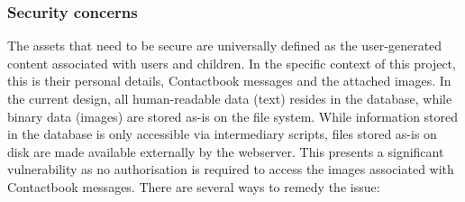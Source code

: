\subsubsection*{Security concerns}
The assets that need to be secure are universally defined as the user-generated content associated with users and children. In the specific context of this project, this is their personal details, Contactbook messages and the attached images. In the current design, all human-readable data (text) resides in the database, while binary data (images) are stored as-is on the file system. While information stored in the database is only accessible via intermediary scripts, files stored as-is on disk are made available externally by the webserver. This presents a significant vulnerability as no authorisation is required to access the images associated with Contactbook messages. There are several ways to remedy the issue:

